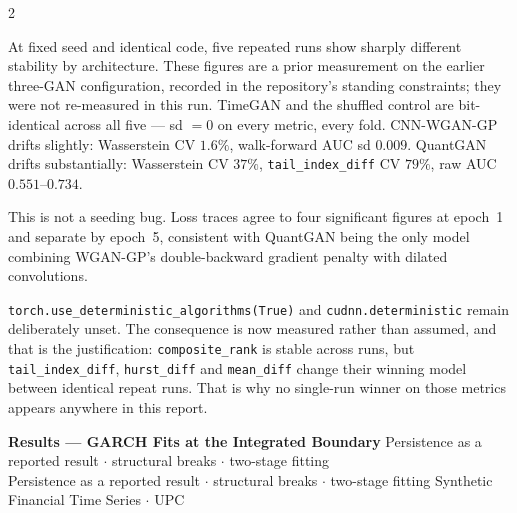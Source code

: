 \documentclass[10pt]{article}
\newcommand{\purplebox}[2]{\begin{tcolorbox}[mybox={Purple}{LBg},title={#1}]#2\end{tcolorbox}}
\newcommand{\pagehead}[2]{%
  \begin{tcolorbox}[enhanced,arc=0pt,outer arc=0pt,boxrule=0pt,
    colback=Navy,colframe=Navy,
    top=5pt,bottom=5pt,left=8pt,right=8pt,
    before skip=0pt,after skip=10pt]
  {\color{white}\large\bfseries #1}%
  \ifx\relax#2\relax\else\\[1pt]{\color{blue!30!white}\small #2}\fi
  \hfill{\color{blue!20!white}\footnotesize Synthetic Financial Time Series $\cdot$ UPC}
  \end{tcolorbox}}
\begin{document}
\begin{multicols}{2}
\purplebox{Run-to-Run Nondeterminism at Fixed Seed}{%
At fixed seed and identical code, five repeated runs show sharply different stability by architecture. These figures are a prior measurement on the earlier three-GAN configuration, recorded in the repository's standing constraints; they were not re-measured in this run. TimeGAN and the shuffled control are bit-identical across all five --- sd $=0$ on every metric, every fold. CNN-WGAN-GP drifts slightly: Wasserstein CV $1.6\%$, walk-forward AUC sd $0.009$. QuantGAN drifts substantially: Wasserstein CV $37\%$, \texttt{tail\_index\_diff} CV $79\%$, raw AUC $0.551$--$0.734$.

\smallskip
This is not a seeding bug. Loss traces agree to four significant figures at epoch~1 and separate by epoch~5, consistent with QuantGAN being the only model combining WGAN-GP's double-backward gradient penalty with dilated convolutions.

\smallskip
\texttt{torch.use\_deterministic\_algorithms(True)} and \texttt{cudnn.deterministic} remain deliberately unset. The consequence is now measured rather than assumed, and that is the justification: \texttt{composite\_rank} is stable across runs, but \texttt{tail\_index\_diff}, \texttt{hurst\_diff} and \texttt{mean\_diff} change their winning model between identical repeat runs. That is why no single-run winner on those metrics appears anywhere in this report.}

\end{multicols}

\clearpage

\pagehead{Results --- GARCH Fits at the Integrated Boundary}
         {Persistence as a reported result $\cdot$ structural breaks $\cdot$ two-stage fitting}
\end{document}
